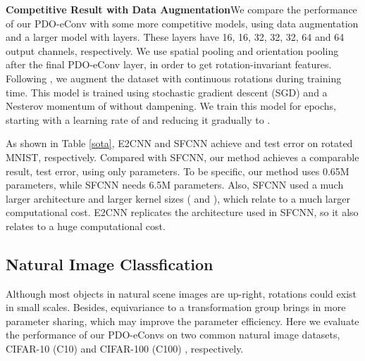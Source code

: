 \documentclass{article}
\begin{document}
\begin{table}[b]
	\caption{Competitive results on MNIST-rot-12k.}\smallskip
	\centering
	\linespread{1.2}\selectfont
	\label{sota}
\end{table}

\textbf{Competitive Result with Data Augmentation}\quad We compare the performance of our PDO-eConv with some more competitive models, using data augmentation and a larger model with  layers. These layers have 16, 16, 32, 32, 32, 64 and 64 output channels, respectively. We use spatial pooling and orientation pooling after the final PDO-eConv layer, in order to get rotation-invariant features. Following \cite{weiler2018learning}, we augment the dataset with continuous rotations during training time. This model is trained using stochastic gradient descent (SGD) and a Nesterov momentum \cite{sutskever2013importance} of  without dampening. We train this model for  epochs, starting with a learning rate of  and reducing it gradually to .

As shown in Table \ref{sota}, E2CNN and SFCNN achieve  and  test error on rotated MNIST, respectively. Compared with SFCNN, our method achieves a comparable result,  test error, using only  parameters. To be specific, our method uses 0.65M parameters, while SFCNN needs 6.5M parameters. Also, SFCNN used a much larger architecture and larger kernel sizes ( and ), which relate to a much larger computational cost. E2CNN replicates the architecture used in SFCNN, so it also relates to a huge computational cost.

\subsection{Natural Image Classfication}
Although most objects in natural scene images are up-right, rotations could exist in small scales. Besides, equivariance to a transformation group brings in more parameter sharing, which may improve the parameter efficiency. Here we evaluate the performance of our PDO-eConvs on two common natural image datasets, CIFAR-10 (C10) and CIFAR-100 (C100) \cite{krizhevsky2009learning}, respectively.
\end{document}
